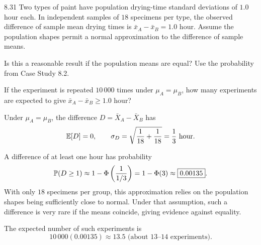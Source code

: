 \documentclass[11pt,oneside]{article}
\begin{document}
\begin{exercise}{8.31}
Two types of paint have population drying-time standard deviations of $1.0$ hour each. In independent samples of $18$ specimens per type, the observed difference of sample mean drying times is $\bar x_A-\bar x_B=1.0$ hour. Assume the population shapes permit a normal approximation to the difference of sample means.
\begin{exercisesubparts}
\item Is this a reasonable result if the population means are equal? Use the probability from Case Study 8.2.
\item If the experiment is repeated $10\,000$ times under $\mu_A=\mu_B$, how many experiments are expected to give $\bar x_A-\bar x_B\ge1.0$ hour?
\end{exercisesubparts}
\end{exercise}
\begin{solution}
Under $\mu_A=\mu_B$, the difference $D=\bar X_A-\bar X_B$ has
\[
\mathbb{E}[D]=0, \qquad
\sigma_D=\sqrt{\frac{1}{18}+\frac{1}{18}}=\frac13\text{ hour}.
\]
\begin{exercisesubparts}
\item A difference of at least one hour has probability
\[
\mathbb{P}(D\ge1)
\approx1-\Phi\left(\frac{1}{1/3}\right)
=1-\Phi(3)\approx\boxed{0.00135}.
\]
With only $18$ specimens per group, this approximation relies on the population shapes being sufficiently close to normal. Under that assumption, such a difference is very rare if the means coincide, giving evidence against equality.
\item The expected number of such experiments is
\[
10\,000(0.00135)\approx\boxed{13.5\text{ (about }13\text{--}14\text{ experiments)}}.
\]
\end{exercisesubparts}
\end{solution}
\end{document}

